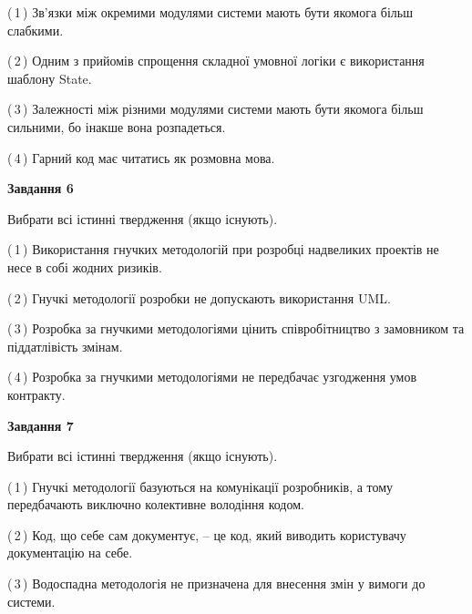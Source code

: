 \documentclass[10pt, ukrainian]{article}
\begin{document}
{\begin {large}
(\,1\,) Зв'язки між окремими модулями системи мають бути якомога більш слабкими. %



(\,2\,) Одним з прийомів спрощення складної умовної логіки є використання шаблону State. %



(\,3\,) Залежності між різними модулями системи мають бути якомога більш сильними, бо інакше вона розпадеться. %



(\,4\,) Гарний код має читатись як розмовна мова. %

\newpage

{\begin {center}\textbf{Завдання 6}\end {center}}\par
Вибрати всі істинні твердження (якщо існують).\par
\vspace{2mm}



(\,1\,) Використання гнучких методологій при розробці надвеликих проектів не несе в собі жодних ризиків. %



(\,2\,) Гнучкі методології розробки не допускають використання UML. %



(\,3\,) Розробка за гнучкими методологіями цінить співробітництво з замовником та піддатлівість змінам. %



(\,4\,) Розробка за гнучкими методологіями не передбачає узгодження умов контракту. %


{\begin {center}\textbf{Завдання 7}\end {center}}\par
Вибрати всі істинні твердження (якщо існують).\par
\vspace{2mm}



(\,1\,) Гнучкі методології базуються на комунікації розробників, а тому передбачають виключно колективне володіння кодом. %



(\,2\,) Код, що себе сам документує, -- це код, який виводить користувачу документацію на себе. %



(\,3\,) Водоспадна методологія не призначена для внесення змін у вимоги до системи. %




\end{large}}
\end{document}
